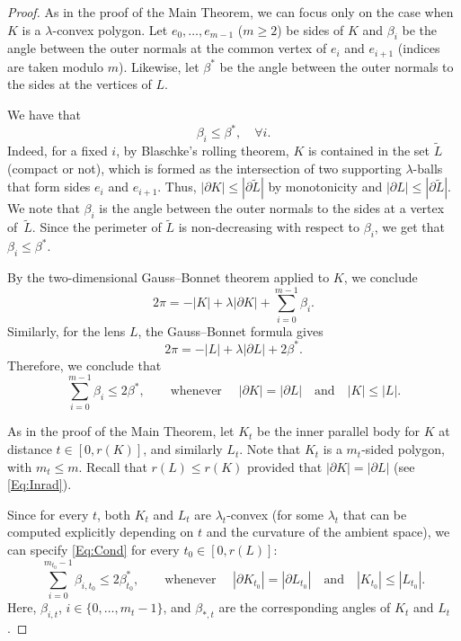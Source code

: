 \documentclass[12pt]{amsart}
\renewcommand{\tilde}{\widetilde}
\renewcommand{\ge}{\geqslant}
\renewcommand{\le}{\leqslant}
\theoremstyle{theorem}
\theoremstyle{Intro}
\theoremstyle{definition}
\theoremstyle{remark}
\theoremstyle{claim}
\numberwithin{equation}{section}
\begin{document}
\begin{proof}
    As in the proof of the Main Theorem, we can focus only on the case when $K$ is a $\lambda$-convex polygon. Let $e_0, \ldots, e_{m-1}$ ($m \ge 2$) be sides of $K$ and $\beta_i$ be the angle between the outer normals at the common vertex of $e_i$ and $e_{i+1}$ (indices are taken modulo $m$).    
    Likewise, let $\beta^*$ be the angle between the outer normals to the sides at the vertices of $L$. 

   We have that 
    \begin{equation}
        \label{Eq:Angles}
        \beta_i \le \beta^*, \quad \forall i.
    \end{equation}
    Indeed, for a fixed $i$, by Blaschke's rolling theorem, $K$ is contained in the set $\tilde{L}$ (compact or not), which is formed as the intersection of two supporting $\lambda$-balls that form sides $e_i$ and $e_{i+1}$. Thus, $|\partial K| \le |\partial \tilde{L}|$ by monotonicity and $|\partial L| \le |\partial \tilde{L}|$. We note that $\beta_i$ is the angle between the outer normals to the sides at a vertex of~$\tilde{L}$. 
    Since the perimeter of $\tilde L$ is non-decreasing with respect to $\beta_i$, we get that $\beta_i \le \beta^*.$ 

    
    By the two-dimensional Gauss--Bonnet theorem applied to $K$, we conclude
    \begin{equation}\label{Eq:GB2}
    2\pi = -|K| + \lambda |\partial K| + \sum_{i=0}^{m-1} \beta_i.
    \end{equation}
    Similarly, for the lens $L$, the Gauss--Bonnet formula gives
    \[
    2\pi = -|L| + \lambda |\partial L| + 2 \beta^*.
    \]
    Therefore, we conclude that 
    \begin{equation}
        \label{Eq:Cond}
        \sum_{i=0}^{m-1} \beta_i \le 2\beta^*, \quad \quad \text{whenever }\quad |\partial K| = |\partial L| \quad \text{and} \quad |K| \le |L|. 
    \end{equation}    

As in the proof of the Main Theorem, let $K_t$ be the inner parallel body for $K$ at distance $t \in [0, r(K)]$, and similarly $L_t$. Note that $K_t$ is a $m_t$-sided polygon, with $m_t \le m$. Recall that $r(L) \le r(K)$ provided that $|\partial K| = |\partial L|$ (see \eqref{Eq:Inrad}).

Since for every $t$, both $K_t$ and $L_t$ are $\lambda_t$-convex (for some $\lambda_t$ that can be computed explicitly depending on $t$ and the curvature of the ambient space), we can specify \eqref{Eq:Cond} for every $t_0 \in [0,r(L)]$:
\begin{equation}
        \label{Eq:Cond2}
        \sum_{i=0}^{m_{t_0}-1} \beta_{i,t_0} \le 2\beta^*_{t_0}, \quad \quad \text{whenever }\quad |\partial K_{t_0}| = |\partial L_{t_0}| \quad \text{and} \quad |K_{t_0}| \le |L_{t_0}|. 
    \end{equation}    
Here, $\beta_{i,t}$, $i \in \{0, \ldots, m_t - 1\}$, and $\beta_{*,t}$ are the corresponding angles of $K_t$ and $L_t$.


\end{proof}
\end{document}
